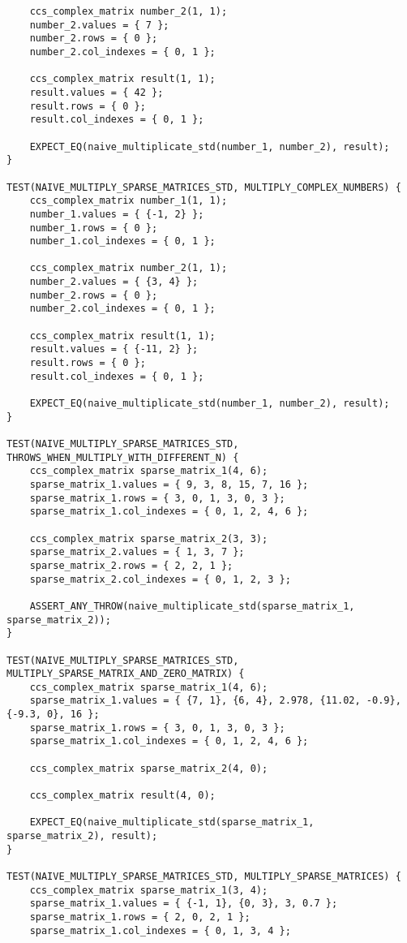 \documentclass{report}
\begin{document}
\begin{itemize}
\begin{itemize}
\begin{lstlisting}
    ccs_complex_matrix number_2(1, 1);
    number_2.values = { 7 };
    number_2.rows = { 0 };
    number_2.col_indexes = { 0, 1 };

    ccs_complex_matrix result(1, 1);
    result.values = { 42 };
    result.rows = { 0 };
    result.col_indexes = { 0, 1 };

    EXPECT_EQ(naive_multiplicate_std(number_1, number_2), result);
}

TEST(NAIVE_MULTIPLY_SPARSE_MATRICES_STD, MULTIPLY_COMPLEX_NUMBERS) {
    ccs_complex_matrix number_1(1, 1);
    number_1.values = { {-1, 2} };
    number_1.rows = { 0 };
    number_1.col_indexes = { 0, 1 };

    ccs_complex_matrix number_2(1, 1);
    number_2.values = { {3, 4} };
    number_2.rows = { 0 };
    number_2.col_indexes = { 0, 1 };

    ccs_complex_matrix result(1, 1);
    result.values = { {-11, 2} };
    result.rows = { 0 };
    result.col_indexes = { 0, 1 };

    EXPECT_EQ(naive_multiplicate_std(number_1, number_2), result);
}

TEST(NAIVE_MULTIPLY_SPARSE_MATRICES_STD, THROWS_WHEN_MULTIPLY_WITH_DIFFERENT_N) {
    ccs_complex_matrix sparse_matrix_1(4, 6);
    sparse_matrix_1.values = { 9, 3, 8, 15, 7, 16 };
    sparse_matrix_1.rows = { 3, 0, 1, 3, 0, 3 };
    sparse_matrix_1.col_indexes = { 0, 1, 2, 4, 6 };

    ccs_complex_matrix sparse_matrix_2(3, 3);
    sparse_matrix_2.values = { 1, 3, 7 };
    sparse_matrix_2.rows = { 2, 2, 1 };
    sparse_matrix_2.col_indexes = { 0, 1, 2, 3 };

    ASSERT_ANY_THROW(naive_multiplicate_std(sparse_matrix_1, sparse_matrix_2));
}

TEST(NAIVE_MULTIPLY_SPARSE_MATRICES_STD, MULTIPLY_SPARSE_MATRIX_AND_ZERO_MATRIX) {
    ccs_complex_matrix sparse_matrix_1(4, 6);
    sparse_matrix_1.values = { {7, 1}, {6, 4}, 2.978, {11.02, -0.9}, {-9.3, 0}, 16 };
    sparse_matrix_1.rows = { 3, 0, 1, 3, 0, 3 };
    sparse_matrix_1.col_indexes = { 0, 1, 2, 4, 6 };

    ccs_complex_matrix sparse_matrix_2(4, 0);

    ccs_complex_matrix result(4, 0);

    EXPECT_EQ(naive_multiplicate_std(sparse_matrix_1, sparse_matrix_2), result);
}

TEST(NAIVE_MULTIPLY_SPARSE_MATRICES_STD, MULTIPLY_SPARSE_MATRICES) {
    ccs_complex_matrix sparse_matrix_1(3, 4);
    sparse_matrix_1.values = { {-1, 1}, {0, 3}, 3, 0.7 };
    sparse_matrix_1.rows = { 2, 0, 2, 1 };
    sparse_matrix_1.col_indexes = { 0, 1, 3, 4 };


\end{lstlisting}
\end{itemize}
\end{itemize}
\end{document}
